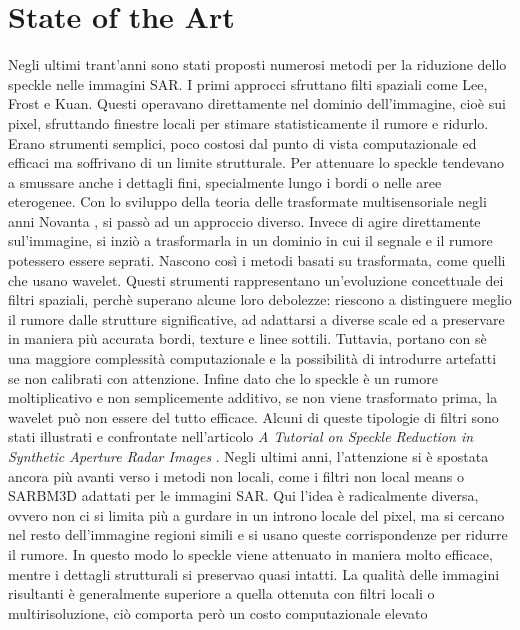 
\chapter{State of the Art}
Negli ultimi trant'anni sono stati proposti numerosi metodi per la riduzione dello speckle nelle immagini SAR.
 I primi approcci sfruttano filti spaziali come Lee, Frost e Kuan.
Questi operavano direttamente nel dominio dell'immagine, cioè sui pixel, sfruttando finestre locali per stimare
 statisticamente il rumore e ridurlo. Erano strumenti semplici, poco costosi dal punto 
di vista computazionale ed efficaci ma soffrivano di un limite strutturale. Per attenuare lo speckle tendevano a 
smussare anche i dettagli fini, specialmente lungo i bordi o nelle aree eterogenee. 
Con lo sviluppo della teoria delle trasformate multisensoriale negli anni Novanta , si passò ad un approccio diverso. 
Invece di agire direttamente sul'immagine, si inziò a trasformarla in un dominio 
in cui il segnale e il rumore potessero essere seprati. Nascono così i metodi basati su trasformata, come quelli che 
usano wavelet. Questi strumenti rappresentano un'evoluzione concettuale dei filtri spaziali,
perchè superano alcune loro debolezze: riescono a distinguere meglio il rumore dalle strutture significative, ad 
adattarsi a diverse scale ed a preservare in maniera più accurata bordi, texture e linee sottili. 
Tuttavia, portano con sè una maggiore complessità computazionale e la possibilità di introdurre artefatti se non 
calibrati con attenzione. Infine dato che lo speckle è un rumore moltiplicativo e non semplicemente 
additivo, se non viene trasformato prima, la wavelet può non essere del tutto efficace. 
Alcuni di queste tipologie di filtri sono stati illustrati e confrontate nell'articolo \textit{A Tutorial on Speckle
Reduction in Synthetic Aperture Radar Images}  \cite{tutorSpeckle}.
Negli ultimi anni, l'attenzione si è spostata ancora più avanti verso i metodi non locali, come i filtri non local means o 
SARBM3D adattati per le immagini SAR. Qui l'idea è radicalmente diversa, ovvero non ci si limita più a gurdare in un 
introno locale del pixel, ma si cercano nel resto dell'immagine regioni simili e si usano queste 
corrispondenze per ridurre il rumore. In questo modo lo speckle viene attenuato in maniera molto efficace, mentre 
i dettagli strutturali si preservao quasi intatti. La qualità delle immagini risultanti è generalmente
superiore a quella ottenuta con filtri locali o multirisoluzione, ciò comporta però un costo computazionale elevato 
